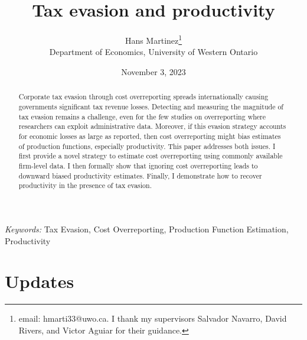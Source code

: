 \documentclass[
  12pt]{article}
\begin{document}
\def\spacingset#1{\renewcommand{\baselinestretch}%
{#1}\small\normalsize} \spacingset{1}



\date{November 3, 2023}
\title{\bf Tax evasion and productivity}
\author{
Hans Martinez\thanks{email: hmarti33@uwo.ca. I thank my supervisors
Salvador Navarro, David Rivers, and Victor Aguiar for their guidance.}\\
Department of Economics, University of Western Ontario\\
}
\maketitle

\bigskip
\bigskip
\begin{abstract}
Corporate tax evasion through cost overreporting spreads internationally
causing governments significant tax revenue losses. Detecting and
measuring the magnitude of tax evasion remains a challenge, even for the
few studies on overreporting where researchers can exploit
administrative data. Moreover, if this evasion strategy accounts for
economic losses as large as reported, then cost overreporting might bias
estimates of production functions, especially productivity. This paper
addresses both issues. I first provide a novel strategy to estimate cost
overreporting using commonly available firm-level data. I then formally
show that ignoring cost overreporting leads to downward biased
productivity estimates. Finally, I demonstrate how to recover
productivity in the presence of tax evasion.
\end{abstract}

\noindent%
{\it Keywords:} Tax Evasion, Cost Overreporting, Production Function
Estimation, Productivity
\vfill

\newpage
\spacingset{1.9} %
\ifdefined\Shaded\renewenvironment{Shaded}{\begin{tcolorbox}[interior hidden, breakable, enhanced, borderline west={3pt}{0pt}{shadecolor}, sharp corners, frame hidden, boxrule=0pt]}{\end{tcolorbox}}\fi

\hypertarget{updates}{%
\section*{Updates}\label{updates}}
\end{document}
